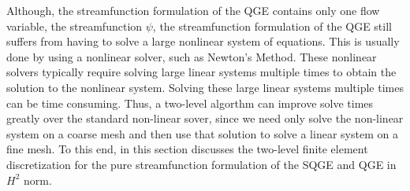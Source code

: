Although, the streamfunction formulation of the QGE contains only one flow
variable, the streamfunction $\psi$, the streamfunction formulation of the QGE
still suffers from having to solve a large nonlinear system of equations. This
is usually done by using a nonlinear solver, such as Newton's Method. These
nonlinear solvers typically require solving large linear systems multiple times
to obtain the solution to the nonlinear system. Solving these large linear
systems multiple times can be time consuming. Thus, a two-level algorthm can
improve solve times greatly over the standard non-linear sover, since we need
only solve the non-linear system on a coarse mesh and then use that solution to
solve a linear system on a fine mesh. To this end, in this section discusses the
two-level finite element discretization for the pure streamfunction formulation
of the SQGE and QGE in $H^2$ norm.
